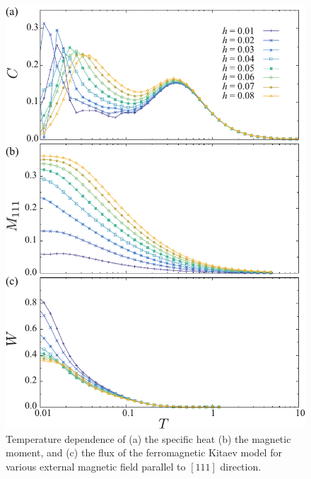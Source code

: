 \documentclass[reprint,amsmath,amssymb,aps,prx]{revtex4-2}
\begin{document}
\begin{figure}
  \begin{center}
    \includegraphics[width=0.9\linewidth]{plot_CMF.pdf}
  \end{center}
  \caption{Temperature dependence of (a) the specific heat (b) the magnetic moment, and (c) the flux of the ferromagnetic Kitaev model for various external magnetic field parallel to $[111]$ direction.}
  \label{fig:CMF_pure}
\end{figure}
\end{document}
